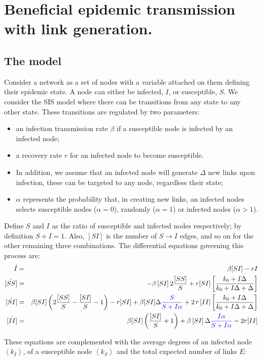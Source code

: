 \documentclass[11pt,final]{article}
\newcommand{\blue}[1]{{\color{blue}{#1}\normalcolor}}
\newcommand{\bea}{\begin{eqnarray}}
\newcommand{\eea}{\end{eqnarray}}
\newcommand{\ra}{\rightarrow}
\newcommand{\f}[2]{\dfrac{#1}{#2}}
\newcommand{\avg}[1]{\left\langle #1 \right\rangle} %
\newcommand{\al}{\alpha}
\newcommand{\dl}{\Delta}
\newcommand{\rup}[1]{\left(#1\right)}
\newcommand{\bup}[1]{\left[#1\right]}
\begin{document}
\section*{Beneficial epidemic transmission with link generation.}

\subsection*{The model}
Consider a network as a set of nodes with a variable attached on them defining their epidemic state. A node can either be infected, $I$, or susceptible, $S$. We consider the SIS model where there can be transitions from any state to any other state. These transitions are regulated by two parameters:
\begin{itemize}
\item an infection transmission rate $\beta$ if a susceptible node is infected by an infected node; 
\item a recovery rate $r$ for an infected node to become susceptible.
\item In addition, we assume that an infected node will generate $\Delta$ new links upon infection, these can be targeted to any node, regardless their state;
\item $\al$ represents the probability that, in creating new links, an infected nodes selects susceptible nodes ($\al=0$), randomly ($\al=1$) or infected nodes ($\al>1$).
\end{itemize}

Define $S$ and $I$ as the ratio of susceptible and infected nodes respectively; by definition $S+I=1$. Also, $[SI]$ is the number of $S \ra I$ edges, and so on for the other remaining three combinations.
The differential equations governing this process are:
\bea
\dot{I}&=& \beta [SI] -rI \\
\dot{[SS]}&=& -\beta \,[SI]\, 2\f{[SS]}{S} +r [SI] \bup{\f{k_{0}+I \Delta}{k_{0}+I \Delta +\Delta}} \\
\dot{[SI]}&=& \beta[SI] \rup{ 2\f{[SS]}{S} -\f{[SI]}{S}-1} -r[SI] +\beta[SI]\dl \blue{\f{S}{S+I\al} }+2\,r\,[II]  \bup{\f{k_{0}+I \Delta}{k_{0}+I \Delta +\Delta}} \\
\dot{[II]}&=& \beta[SI] \rup{\f{[SI]}{S} +1} +\beta\,[SI]\, \dl  \blue{\f{I\al}{S+I\al}} -2r [II]
\eea

These equations are complemented with the average degrees of an infected node $\avg{k_{I}}$, of a susceptible node $\avg{k_{S}}$ and the total expected number of links $E$:
\end{document}
